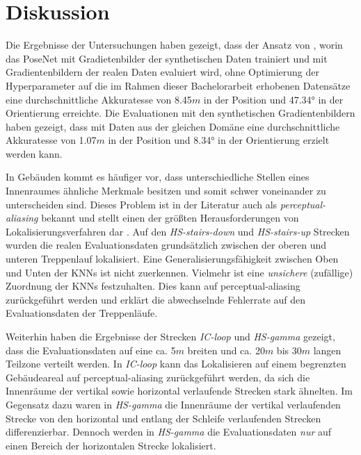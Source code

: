 
\section{Diskussion}
\label{sec:kapitel_5}


Die Ergebnisse der Untersuchungen haben gezeigt, dass der Ansatz von \citet{acharyaBIMPoseNetIndoorCamera2019}, worin das PoseNet mit Gradietenbilder der synthetischen Daten trainiert und mit Gradientenbildern der realen Daten evaluiert wird, ohne Optimierung der Hyperparameter auf die im Rahmen dieser Bachelorarbeit erhobenen Datensätze eine durchschnittliche Akkuratesse von 8.45$m$ in der Position und 47.34° in der Orientierung erreichte. Die Evaluationen mit den synthetischen Gradientenbildern haben gezeigt, dass mit Daten aus der gleichen Domäne eine durchschnittliche Akkuratesse von 1.07$m$ in der Position und 8.34° in der Orientierung erzielt werden kann. 


In Gebäuden kommt es häufiger vor, dass unterschiedliche Stellen eines Innenraumes ähnliche Merkmale besitzen und somit schwer voneinander zu unterscheiden sind. Dieses Problem ist in der Literatur auch als \textit{perceptual-aliasing} bekannt und stellt einen der größten Herausforderungen von Lokalisierungsverfahren dar \cite{lowryVisualPlaceRecognition2016}. Auf den \textit{HS-stairs-down} und \textit{HS-stairs-up} Strecken wurden die realen Evaluationsdaten grundsätzlich zwischen der oberen und unteren Treppenlauf lokalisiert. Eine Generalisierungsfähigkeit zwischen Oben und Unten der KNNs ist nicht zuerkennen. Vielmehr ist eine \textit{unsichere} (zufällige) Zuordnung der KNNs festzuhalten. Dies kann auf perceptual-aliasing zurückgeführt werden und erklärt die abwechselnde Fehlerrate auf den Evaluationsdaten der Treppenläufe.

Weiterhin haben die Ergebnisse der Strecken \textit{IC-loop} und \textit{HS-gamma} gezeigt, dass die Evaluationsdaten auf eine ca. 5$m$ breiten und ca. 20$m$ bis 30$m$ langen Teilzone verteilt werden. In \textit{IC-loop} kann das Lokalisieren auf einem begrenzten Gebäudeareal auf perceptual-aliasing zurückgeführt werden, da sich die Innenräume der vertikal sowie horizontal verlaufende Strecken stark ähnelten. Im Gegensatz dazu waren in \textit{HS-gamma} die Innenräume der vertikal verlaufenden Strecke von den horizontal und entlang der Schleife verlaufenden Strecken differenzierbar. Dennoch werden in \textit{HS-gamma} die Evaluationsdaten \textit{nur} auf einen Bereich der horizontalen Strecke lokalisiert.



